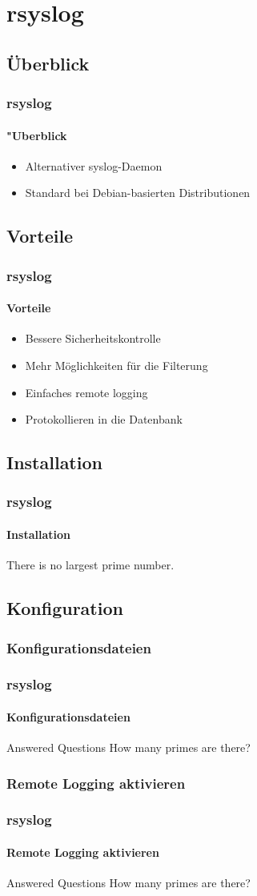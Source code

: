 \section{rsyslog}
\subsection{Überblick}
\begin{frame}
	\frametitle{rsyslog}
	\framesubtitle{"Uberblick}
	\begin{itemize}
		\item Alternativer syslog-Daemon
		\item Standard bei Debian-basierten Distributionen
	\end{itemize}
\end{frame}

\subsection{Vorteile}
\begin{frame}
	\frametitle{rsyslog}
	\framesubtitle{Vorteile}
	\begin{itemize}
		\item Bessere Sicherheitskontrolle
		\item Mehr Möglichkeiten für die Filterung
		\item Einfaches remote logging
		\item Protokollieren in die Datenbank
	\end{itemize}
\end{frame}

\subsection{Installation}
\begin{frame}
	\frametitle{rsyslog}
	\framesubtitle{Installation}
  \begin{theorem}
    There is no largest prime number.
  \end{theorem}
\end{frame}

\subsection{Konfiguration}
\subsubsection{Konfigurationsdateien}
\begin{frame}
	\frametitle{rsyslog}
	\framesubtitle{Konfigurationsdateien}
  \begin{block}{Answered Questions}
    How many primes are there?
  \end{block}
\end{frame}

\subsubsection{Remote Logging aktivieren}
\begin{frame}
	\frametitle{rsyslog}
	\framesubtitle{Remote Logging aktivieren}
  \begin{block}{Answered Questions}
    How many primes are there?
  \end{block}
\end{frame}
